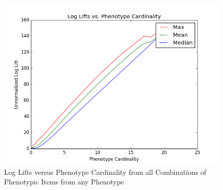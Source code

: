 \documentclass{sig-alternate}
\begin{document}



\begin{figure} [t]
\centering
\includegraphics[width=\linewidth]{logLiftsAcrossPhenoCard_MMM_relabeled.png}
\caption{Log Lifts versus Phenotype Cardinality from all Combinations of Phenotypic Items from any Phenotype}
\label{fig:log-lift}
\end{figure}
\end{document}
